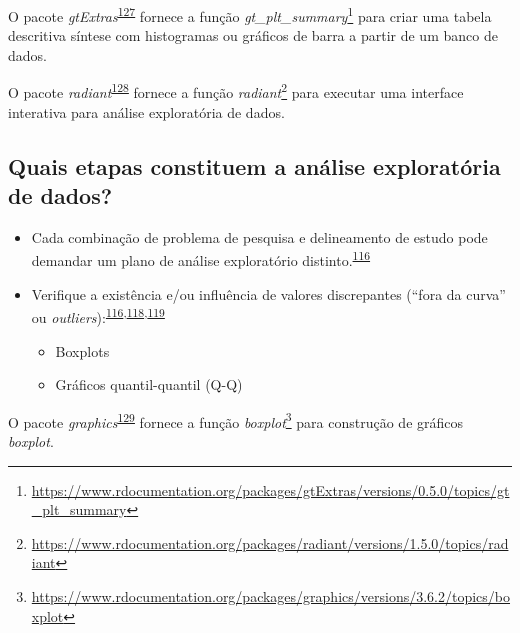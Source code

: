 \documentclass[
  a4paper,
]{book}
\renewcommand{\href}[2]{#2\footnote{\url{#1}}}
\newenvironment{infobox}[1]
  {
  \begin{itemize}
  \renewcommand{\labelitemi}{
    \raisebox{-.7\height}[0pt][0pt]{
      {\setkeys{Gin}{width=3em,keepaspectratio}
        \texttt{[image: \#1]}}
    }
  }
  \setlength{\fboxsep}{1em}
  \begin{blackbox}
  \item
  }
  {
  \end{blackbox}
  \end{itemize}
  }
\begin{document}
\begin{infobox}{images/Rlogo}
O pacote \emph{gtExtras}\textsuperscript{\protect\hyperlink{ref-gtExtras}{127}} fornece a função \href{https://www.rdocumentation.org/packages/gtExtras/versions/0.5.0/topics/gt_plt_summary}{\emph{gt\_plt\_summary}} para criar uma tabela descritiva síntese com histogramas ou gráficos de barra a partir de um banco de dados.

\end{infobox}

\begin{infobox}{images/Rlogo}
O pacote \emph{radiant}\textsuperscript{\protect\hyperlink{ref-radiant}{128}} fornece a função \href{https://www.rdocumentation.org/packages/radiant/versions/1.5.0/topics/radiant}{\emph{radiant}} para executar uma interface interativa para análise exploratória de dados.

\end{infobox}

\hypertarget{quais-etapas-constituem-a-anuxe1lise-exploratuxf3ria-de-dados}{%
\subsection{Quais etapas constituem a análise exploratória de dados?}\label{quais-etapas-constituem-a-anuxe1lise-exploratuxf3ria-de-dados}}

\begin{itemize}
\item
  Cada combinação de problema de pesquisa e delineamento de estudo pode demandar um plano de análise exploratório distinto.\textsuperscript{\protect\hyperlink{ref-zuur2009}{116}}
\item
  Verifique a existência e/ou influência de valores discrepantes (``fora da curva'' ou \emph{outliers}):\textsuperscript{\protect\hyperlink{ref-zuur2009}{116},\protect\hyperlink{ref-chatfield1986}{118},\protect\hyperlink{ref-Ferketich1986}{119}}

  \begin{itemize}
  \item
    Boxplots
  \item
    Gráficos quantil-quantil (Q-Q)
  \end{itemize}
\end{itemize}

\begin{infobox}{images/Rlogo}
O pacote \emph{graphics}\textsuperscript{\protect\hyperlink{ref-graphics}{129}} fornece a função \href{https://www.rdocumentation.org/packages/graphics/versions/3.6.2/topics/boxplot}{\emph{boxplot}} para construção de gráficos \emph{boxplot}.

\end{infobox}
\end{document}
